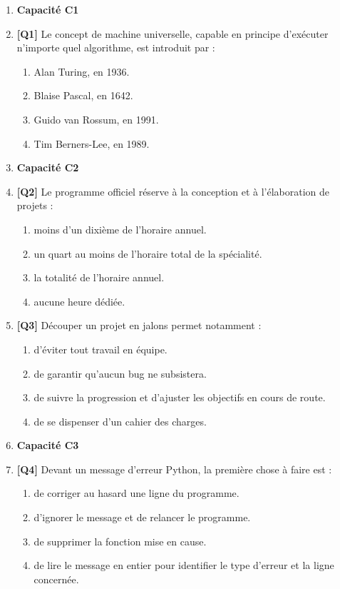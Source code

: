 \begin{enumerate}

\item[] \textbf{Capacité C1}

\item \textbf{[Q1]} Le concept de machine universelle, capable en principe d'exécuter n'importe quel algorithme, est introduit par :
  \begin{enumerate}[label=\Alph*.]
    \item Alan Turing, en 1936.
    \item Blaise Pascal, en 1642.
    \item Guido van Rossum, en 1991.
    \item Tim Berners-Lee, en 1989.
  \end{enumerate}

\item[] \textbf{Capacité C2}

\item \textbf{[Q2]} Le programme officiel réserve à la conception et à l'élaboration de projets :
  \begin{enumerate}[label=\Alph*.]
    \item moins d'un dixième de l'horaire annuel.
    \item un quart au moins de l'horaire total de la spécialité.
    \item la totalité de l'horaire annuel.
    \item aucune heure dédiée.
  \end{enumerate}

\item \textbf{[Q3]} Découper un projet en jalons permet notamment :
  \begin{enumerate}[label=\Alph*.]
    \item d'éviter tout travail en équipe.
    \item de garantir qu'aucun bug ne subsistera.
    \item de suivre la progression et d'ajuster les objectifs en cours de route.
    \item de se dispenser d'un cahier des charges.
  \end{enumerate}

\item[] \textbf{Capacité C3}

\item \textbf{[Q4]} Devant un message d'erreur Python, la première chose à faire est :
  \begin{enumerate}[label=\Alph*.]
    \item de corriger au hasard une ligne du programme.
    \item d'ignorer le message et de relancer le programme.
    \item de supprimer la fonction mise en cause.
    \item de lire le message en entier pour identifier le type d'erreur et la ligne concernée.
  \end{enumerate}


\end{enumerate}
